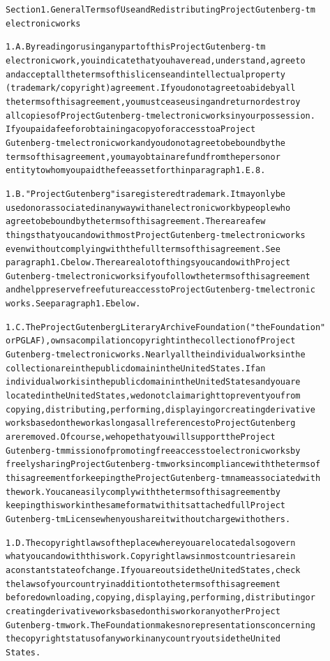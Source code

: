 \documentclass[12pt]{book}[2005/09/16]
\newenvironment{PGtext}{%
\begin{alltt}
\fontsize{8.1}{9}\ttfamily\selectfont}%
{\end{alltt}}
\begin{document}
\begin{PGtext}
Section 1.  General Terms of Use and Redistributing Project Gutenberg-tm
electronic works

1.A.  By reading or using any part of this Project Gutenberg-tm
electronic work, you indicate that you have read, understand, agree to
and accept all the terms of this license and intellectual property
(trademark/copyright) agreement.  If you do not agree to abide by all
the terms of this agreement, you must cease using and return or destroy
all copies of Project Gutenberg-tm electronic works in your possession.
If you paid a fee for obtaining a copy of or access to a Project
Gutenberg-tm electronic work and you do not agree to be bound by the
terms of this agreement, you may obtain a refund from the person or
entity to whom you paid the fee as set forth in paragraph 1.E.8.

1.B.  "Project Gutenberg" is a registered trademark.  It may only be
used on or associated in any way with an electronic work by people who
agree to be bound by the terms of this agreement.  There are a few
things that you can do with most Project Gutenberg-tm electronic works
even without complying with the full terms of this agreement.  See
paragraph 1.C below.  There are a lot of things you can do with Project
Gutenberg-tm electronic works if you follow the terms of this agreement
and help preserve free future access to Project Gutenberg-tm electronic
works.  See paragraph 1.E below.

1.C.  The Project Gutenberg Literary Archive Foundation ("the Foundation"
or PGLAF), owns a compilation copyright in the collection of Project
Gutenberg-tm electronic works.  Nearly all the individual works in the
collection are in the public domain in the United States.  If an
individual work is in the public domain in the United States and you are
located in the United States, we do not claim a right to prevent you from
copying, distributing, performing, displaying or creating derivative
works based on the work as long as all references to Project Gutenberg
are removed.  Of course, we hope that you will support the Project
Gutenberg-tm mission of promoting free access to electronic works by
freely sharing Project Gutenberg-tm works in compliance with the terms of
this agreement for keeping the Project Gutenberg-tm name associated with
the work.  You can easily comply with the terms of this agreement by
keeping this work in the same format with its attached full Project
Gutenberg-tm License when you share it without charge with others.

1.D.  The copyright laws of the place where you are located also govern
what you can do with this work.  Copyright laws in most countries are in
a constant state of change.  If you are outside the United States, check
the laws of your country in addition to the terms of this agreement
before downloading, copying, displaying, performing, distributing or
creating derivative works based on this work or any other Project
Gutenberg-tm work.  The Foundation makes no representations concerning
the copyright status of any work in any country outside the United
States.


\end{PGtext}
\end{document}
